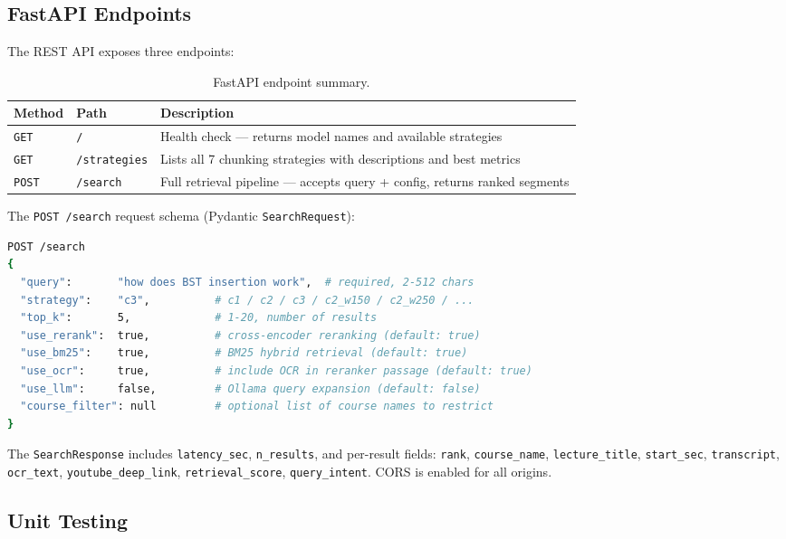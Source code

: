 \documentclass[12pt,a4paper]{article}
\begin{document}
\subsection{FastAPI Endpoints}

The REST API exposes three endpoints:

\begin{table}[H]
\centering
\small
\caption{FastAPI endpoint summary.}
\label{tab:api}
\begin{tabular}{llp{7cm}}
\toprule
\textbf{Method} & \textbf{Path} & \textbf{Description} \\
\midrule
\texttt{GET}  & \texttt{/}           & Health check — returns model names and available strategies \\
\texttt{GET}  & \texttt{/strategies} & Lists all 7 chunking strategies with descriptions and best metrics \\
\texttt{POST} & \texttt{/search}     & Full retrieval pipeline — accepts query + config, returns ranked segments \\
\bottomrule
\end{tabular}
\end{table}

The \texttt{POST /search} request schema (Pydantic \texttt{SearchRequest}):

\begin{lstlisting}[language=bash]
POST /search
{
  "query":       "how does BST insertion work",  # required, 2-512 chars
  "strategy":    "c3",          # c1 / c2 / c3 / c2_w150 / c2_w250 / ...
  "top_k":       5,             # 1-20, number of results
  "use_rerank":  true,          # cross-encoder reranking (default: true)
  "use_bm25":    true,          # BM25 hybrid retrieval (default: true)
  "use_ocr":     true,          # include OCR in reranker passage (default: true)
  "use_llm":     false,         # Ollama query expansion (default: false)
  "course_filter": null         # optional list of course names to restrict
}
\end{lstlisting}

The \texttt{SearchResponse} includes \texttt{latency\_sec}, \texttt{n\_results}, and per-result fields: \texttt{rank}, \texttt{course\_name}, \texttt{lecture\_title}, \texttt{start\_sec}, \texttt{transcript}, \texttt{ocr\_text}, \texttt{youtube\_deep\_link}, \texttt{retrieval\_score}, \texttt{query\_intent}. CORS is enabled for all origins.

\subsection{Unit Testing}
\end{document}
